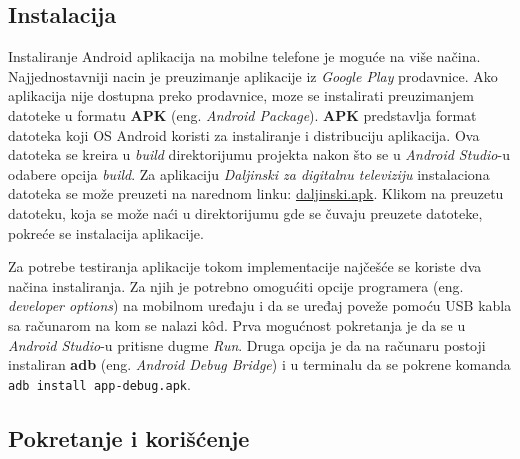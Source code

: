 \documentclass[implementacija.tex]{subfiles}
\begin{document}
\subsection{Instalacija}
Instaliranje Android aplikacija na mobilne telefone je moguće na više načina. Najjednostavniji nacin je preuzimanje aplikacije iz \textit{Google Play} prodavnice. Ako aplikacija nije dostupna preko prodavnice, moze se instalirati preuzimanjem datoteke u formatu \textbf{APK} (eng. \textit{Android Package}). \textbf{APK} predstavlja format datoteka koji OS Android koristi za instaliranje i distribuciju aplikacija. Ova datoteka se kreira u \textit{build} direktorijumu projekta nakon što se u \textit{Android Studio}-u odabere opcija \textit{build}. Za aplikaciju \textit{Daljinski za digitalnu televiziju} instalaciona datoteka se može preuzeti na narednom linku: \href{https://drive.google.com/file/d/1gBlfRibn4jrFDe3TTBCsHUq9MDowEBty/view?usp=drive_link}{daljinski.apk}. Klikom na preuzetu datoteku, koja se može naći u direktorijumu gde se čuvaju preuzete datoteke, pokreće se instalacija aplikacije.

Za potrebe testiranja aplikacije tokom implementacije najčešće se koriste dva načina instaliranja. Za njih je potrebno omogućiti opcije programera (eng. \textit{developer options}) na mobilnom uređaju i da se uređaj poveže pomoću USB kabla sa računarom na kom se nalazi k\^{o}d. Prva mogućnost pokretanja je da se u \textit{Android Studio}-u pritisne dugme \textit{Run}. Druga opcija je da na računaru postoji instaliran \textbf{adb} (eng. \textit{Android Debug Bridge}) i u terminalu da se pokrene komanda \verb|adb install app-debug.apk|. 

\subsection{Pokretanje i korišćenje}
\end{document}
